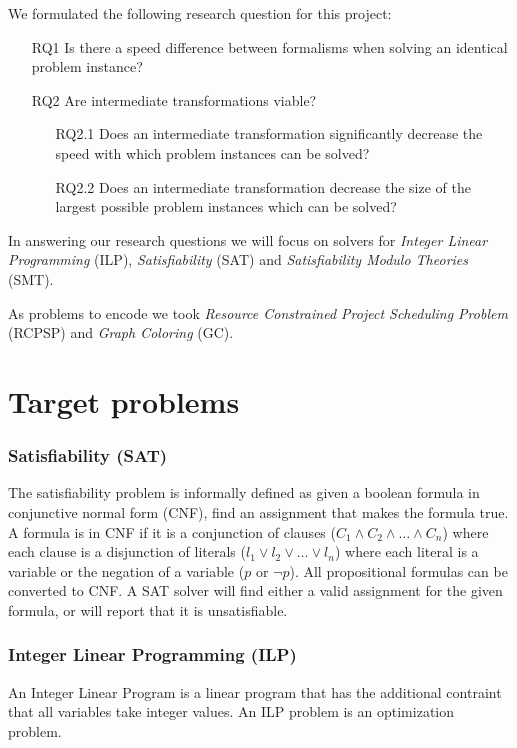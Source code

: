 \documentclass{sig-alternate}
\begin{document}
We formulated the following research question for this project:

\begin{enumerate}
\item[RQ1]{Is there a speed difference between formalisms when solving an identical problem instance?}
\item[RQ2]{Are intermediate transformations viable?}
	\begin{enumerate}
	\item[RQ2.1]{Does an intermediate transformation significantly decrease the speed with which problem instances can be solved?}
	\item[RQ2.2]{Does an intermediate transformation decrease the size of the largest possible problem instances which can be solved?}
	\end{enumerate}
\end{enumerate}

In answering our research questions we will focus on solvers for \emph{Integer Linear Programming} (ILP), \emph{Satisfiability} (SAT) and \emph{Satisfiability Modulo Theories} (SMT).

As problems to encode we took \emph{Resource Constrained Project Scheduling Problem} (RCPSP) and \emph{Graph Coloring} (GC).

\section {Target problems}

\subsubsection*{Satisfiability (SAT)}

The satisfiability problem is informally defined as given a boolean formula in conjunctive normal form (CNF), find an assignment that makes the formula true. A formula is in CNF if it is a conjunction of clauses ($C_1 \wedge C_2 \wedge \ldots \wedge C_n$) where each clause is a disjunction of literals ($l_1 \lor l_2 \lor \ldots \lor l_n$) where each literal is a variable or the negation of a variable ($p$ or $\neg p$). All propositional formulas can be converted to CNF.
A SAT solver will find either a valid assignment for the given formula, or will report that it is unsatisfiable.

\subsubsection*{Integer Linear Programming (ILP)}
An Integer Linear Program is a linear program that has the additional contraint that all variables take integer values. An ILP problem is an optimization problem.
\end{document}
